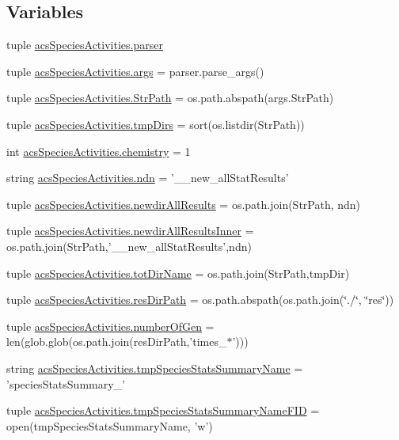 \subsection*{Variables}
\begin{DoxyCompactItemize}
\item 
tuple \hyperlink{a00129_aab55eec317b77f6c91a884938a106d3f}{acs\-Species\-Activities.\-parser}
\item 
tuple \hyperlink{a00129_a2dd673f2cf596c509afd7ad0f3df286b}{acs\-Species\-Activities.\-args} = parser.\-parse\-\_\-args()
\item 
tuple \hyperlink{a00129_a05f0f829ce4df27678aa19d4e5f10c54}{acs\-Species\-Activities.\-Str\-Path} = os.\-path.\-abspath(args.\-Str\-Path)
\item 
tuple \hyperlink{a00129_addf4c61c6afe70a2ea39931695ddc36b}{acs\-Species\-Activities.\-tmp\-Dirs} = sort(os.\-listdir(Str\-Path))
\item 
int \hyperlink{a00129_a5459c566e6ccdf02747a3c16089a5593}{acs\-Species\-Activities.\-chemistry} = 1
\item 
string \hyperlink{a00129_ad2a87ed28d0f42525ce49c390f390298}{acs\-Species\-Activities.\-ndn} = '\-\_\-\_\-new\-\_\-all\-Stat\-Results'
\item 
tuple \hyperlink{a00129_a4fc28291b7f61ee2fa8969fa7a690ba2}{acs\-Species\-Activities.\-newdir\-All\-Results} = os.\-path.\-join(Str\-Path, ndn)
\item 
tuple \hyperlink{a00129_ae77a5ce35739a29f29f9df698d91f1c9}{acs\-Species\-Activities.\-newdir\-All\-Results\-Inner} = os.\-path.\-join(Str\-Path,'\-\_\-\_\-new\-\_\-all\-Stat\-Results',ndn)
\item 
tuple \hyperlink{a00129_aa71c948cf1d0699207eafcd30beb394e}{acs\-Species\-Activities.\-tot\-Dir\-Name} = os.\-path.\-join(Str\-Path,tmp\-Dir)
\item 
tuple \hyperlink{a00129_a2c1728d3ec9815ec7cf41653e953524c}{acs\-Species\-Activities.\-res\-Dir\-Path} = os.\-path.\-abspath(os.\-path.\-join(\char`\"{}./\char`\"{}, \char`\"{}res\char`\"{}))
\item 
tuple \hyperlink{a00129_acceae37ca98ccf6dc25c9f538fda386f}{acs\-Species\-Activities.\-number\-Of\-Gen} = len(glob.\-glob(os.\-path.\-join(res\-Dir\-Path,'times\-\_\-$\ast$')))
\item 
string \hyperlink{a00129_aceab16acbf85893dcacfcfd921c9da12}{acs\-Species\-Activities.\-tmp\-Species\-Stats\-Summary\-Name} = 'species\-Stats\-Summary\-\_\-'
\item 
tuple \hyperlink{a00129_a57b362cf15dda461a59c719a92177c3a}{acs\-Species\-Activities.\-tmp\-Species\-Stats\-Summary\-Name\-F\-I\-D} = open(tmp\-Species\-Stats\-Summary\-Name, 'w')

\end{DoxyCompactItemize}
